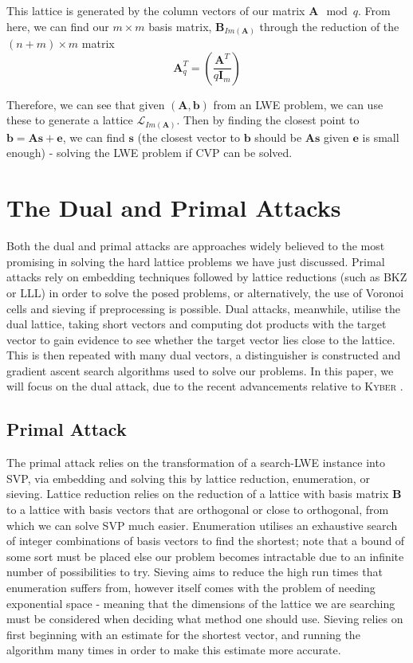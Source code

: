 \documentclass[a4paper, 10pt]{article}
\theoremstyle{definition}
\begin{document}
This lattice is generated by the column vectors of our matrix $\mathbf{A}\mod{q}$. From here, we can find our $m \times m$ basis matrix, $\textbf{B}_{Im(\textbf{A})}$ through the reduction of the $(n+m) \times m$ matrix
\[\mathbf{A}^T_q = (\frac{\mathbf{A}^T}{q\mathbf{I}_m})\]

Therefore, we can see that given $(\mathbf{A}, \mathbf{b})$ from an \ac{LWE} problem, we can use these to generate a lattice $\mathcal{L}_{Im(\mathbf{A})}$. Then by finding the closest point to $\mathbf{b} = \mathbf{As} + \mathbf{e}$, we can find $\mathbf{s}$ (the closest vector to $\mathbf{b}$ should be $\mathbf{As}$ given $\mathbf{e}$ is small enough) - solving the \ac{LWE} problem if \ac{CVP} can be solved.




\section{The Dual and Primal Attacks}

Both the dual and primal attacks are approaches widely believed to the most promising in solving the hard lattice problems we have just discussed. Primal attacks rely on embedding techniques followed by lattice reductions (such as BKZ or LLL) in order to solve the posed problems, or alternatively, the use of Voronoi cells and sieving if preprocessing is possible. Dual attacks, meanwhile, utilise the dual lattice, taking short vectors and computing dot products with the target vector to gain evidence to see  whether the target vector lies close to the lattice. This is then repeated with many dual vectors, a distinguisher is constructed and gradient ascent search algorithms used to solve our problems. In this paper, we will focus on the dual attack, due to the recent advancements relative to \textsc{Kyber} \cite{matzov_2022_6412487}.

\subsection{Primal Attack}

The primal attack relies on the transformation of a search-\ac{LWE} instance into \ac{SVP}, via embedding and solving this by lattice reduction, enumeration, or sieving. Lattice reduction relies on the reduction of a lattice with basis matrix $\mathbf{B}$ to a lattice with basis vectors that are orthogonal or close to orthogonal, from which we can solve \ac{SVP} much easier. Enumeration utilises an exhaustive search of integer combinations of basis vectors to find the shortest; note that a bound of some sort must be placed else our problem becomes intractable due to an infinite number of possibilities to try. Sieving aims to reduce the high run times that enumeration suffers from, however itself comes with the problem of needing exponential space - meaning that the dimensions of the lattice we are searching must be considered when deciding what method one should use. Sieving relies on first beginning with an estimate for the shortest vector, and running the algorithm many times in order to make this estimate more accurate.
\end{document}
